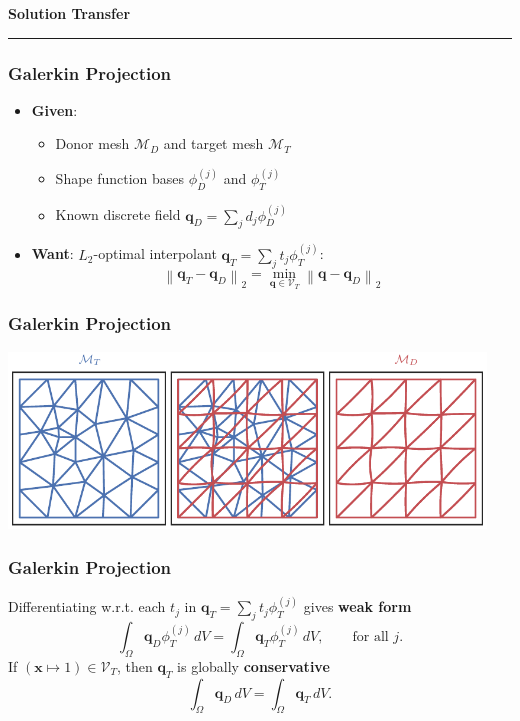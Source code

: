 \documentclass{beamer}
\begin{document}

\begin{frame}
\centering
{\Large \bf Solution Transfer}
\rule{0.82\textwidth}{1pt}
\end{frame}

\begin{frame}
\frametitle{Galerkin Projection}
\begin{itemize}
\item \textbf{Given}:
\begin{itemize}
\pause
\item Donor mesh \(\mathcal{M}_D\) and target mesh \(\mathcal{M}_T\)
\pause
\item Shape function bases \(\phi_D^{(j)}\) and \(\phi_T^{(j)}\)
\pause
\item Known discrete field \(\bm{q}_D = \sum_j d_j \phi_D^{(j)}\)
\end{itemize}
\pause
\item \textbf{Want}: \(L_2\)-optimal interpolant
\(\bm{q}_T = \sum_j t_j \phi_T^{(j)}\):
\begin{equation*}
\left \lVert \bm{q}_T - \bm{q}_D \right \rVert_2 =
\min_{\bm{q} \in \mathcal{V}_T}
\left \lVert \bm{q} - \bm{q}_D \right \rVert_2
\end{equation*}
\end{itemize}
\end{frame}

\begin{frame}
\frametitle{Galerkin Projection}
\begin{center}
\includegraphics[width=0.95\textwidth]
                {../images/solution-transfer/main_figure00.pdf}
\end{center}
\end{frame}

\begin{frame}
\frametitle{Galerkin Projection}
Differentiating w.r.t. each \(t_j\) in
\(\bm{q}_T = \sum_j t_j \phi_T^{(j)}\) gives \textbf{weak form}
\begin{equation*}
\int_{\Omega} \bm{q}_D \phi_T^{(j)} \, dV =
  \int_{\Omega} \bm{q}_T \phi_T^{(j)} \, dV, \qquad \text{for all } j.
\end{equation*}
\pause
If \(\left(\bm{x} \mapsto 1\right) \in \mathcal{V}_T\), then \(\bm{q}_T\)
is globally \textbf{conservative}
\begin{equation*}
\int_{\Omega} \bm{q}_D \, dV =
  \int_{\Omega} \bm{q}_T \, dV.
\end{equation*}
\end{frame}
\end{document}

